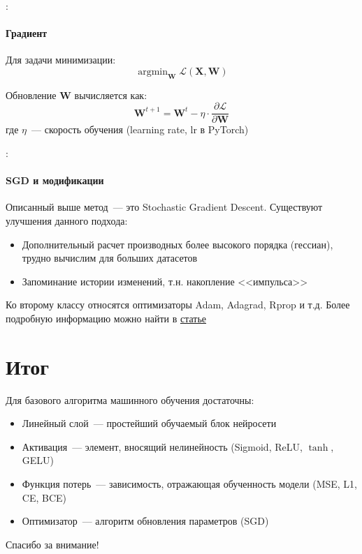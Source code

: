 \documentclass{beamer}
\DeclareMathOperator*{\argmin}{argmin}
\newcommand{\mtx}[1]{\boldsymbol{#1}}
\newcommand{\Loss}{\mathcal{L}}
\begin{document}
\begin{frame}{\secname : \subsecname}
  \framesubtitle{Градиент}


  Для задачи минимизации:
  $$
  \argmin_{\mtx{W}}\Loss\left(\mtx{X},\mtx{W}\right)
  $$

  Обновление $\mtx{W}$ вычисляется как:
  $$
  \mtx{W}^{t+1} = \mtx{W}^t - \eta \cdot \frac{\partial\Loss}{\partial\mtx{W}}
  $$
  где $\eta$~--- скорость обучения (learning rate, lr в PyTorch)
\end{frame}

\begin{frame}{\secname : \subsecname}
  \framesubtitle{SGD и модификации}

  Описанный выше метод~--- это Stochastic Gradient Descent.
  Существуют улучшения данного подхода:
  \begin{itemize}
    \item Дополнительный расчет производных более высокого порядка
      (гессиан), трудно вычислим для больших датасетов
    \item Запоминание истории изменений, т.н. накопление <<импульса>>
  \end{itemize}

  Ко второму классу относятся оптимизаторы Adam, Adagrad, Rprop и
  т.д. Более подробную информацию можно найти в
  \href{https://habr.com/ru/articles/318970/}{статье}
\end{frame}

\section{Итог}

\begin{frame}{\secname}
  Для базового алгоритма машинного обучения достаточны:
  \begin{itemize}
    \item Линейный слой~--- простейший обучаемый блок нейросети
    \item Активация~--- элемент, вносящий нелинейность (Sigmoid,
      ReLU, $\tanh$, GELU)
    \item Функция потерь~--- зависимость, отражающая обученность
      модели (MSE, L1, CE, BCE)
    \item Оптимизатор~--- алгоритм обновления параметров (SGD)
  \end{itemize}
\end{frame}

\begin{frame}
  \begin{center}
    \Huge Спасибо за внимание!
  \end{center}
\end{frame}
\end{document}
